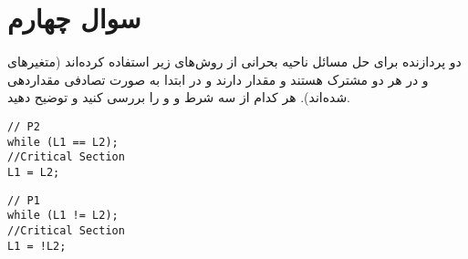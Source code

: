 \section{سوال چهارم}

دو پردازنده برای حل مسائل ناحیه بحرانی از روش‌های زیر استفاده کرده‌اند (متغیرهای  و  در هر دو مشترک هستند و مقدار  دارند و در ابتدا به صورت تصادفی مقداردهی شده‌اند). هر کدام از سه شرط  و  و  را بررسی کنید و توضیح دهید.





\begin{multicols}{2}
\centering
\begin{latin}
\begin{lstlisting}[caption=Code of Q4, label=cpp_code_example]
// P2
while (L1 == L2);
//Critical Section
L1 = L2;
\end{lstlisting}
\end{latin}
\begin{latin}
\begin{lstlisting}[caption=Code of Q4, label=cpp_code_example]
// P1
while (L1 != L2);
//Critical Section
L1 = !L2;
\end{lstlisting}
\end{latin}	
\end{multicols}






\begin{qsolve}
	
\end{qsolve}
